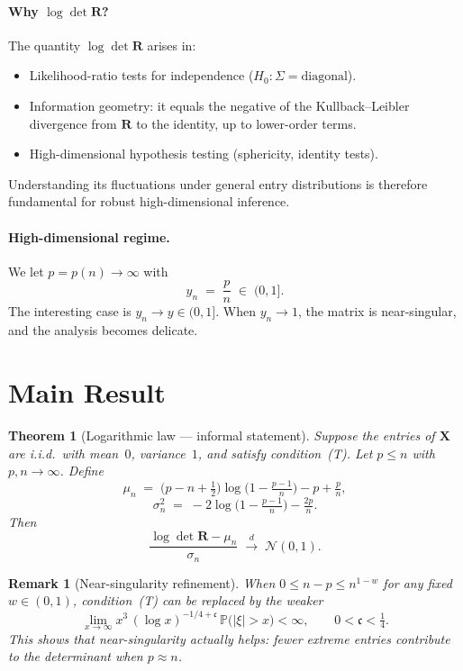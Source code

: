 \documentclass[11pt,a4paper]{article}
\newtheorem{theorem}{Theorem}
\newtheorem{remark}{Remark}
\begin{document}
\paragraph{Why $\log\det\mathbf{R}$?}
The quantity $\log\det\mathbf{R}$ arises in:
\begin{itemize}[nosep]
  \item Likelihood-ratio tests for independence ($H_0\colon \Sigma = \text{diagonal}$).
  \item Information geometry: it equals the negative of the Kullback--Leibler divergence from $\mathbf{R}$ to the identity, up to lower-order terms.
  \item High-dimensional hypothesis testing (sphericity, identity tests).
\end{itemize}
Understanding its fluctuations under general entry distributions is therefore fundamental for robust high-dimensional inference.

\paragraph{High-dimensional regime.}
We let $p = p(n) \to \infty$ with
\[
  y_n \;=\; \frac{p}{n} \;\in\; (0,1].
\]
The interesting case is $y_n \to y \in (0,1]$.  When $y_n\to 1$, the matrix is near-singular, and the analysis becomes delicate.

\section{Main Result}

\begin{theorem}[Logarithmic law --- informal statement]
Suppose the entries of $\mathbf{X}$ are i.i.d.\ with mean~$0$, variance~$1$, and satisfy condition~\emph{(T)}.
Let $p \le n$ with $p,n\to\infty$.  Define
\[
  \mu_n \;=\; \bigl(p - n + \tfrac{1}{2}\bigr)\log\!\bigl(1 - \tfrac{p-1}{n}\bigr) - p + \tfrac{p}{n},
\]
\[
  \sigma_n^{2} \;=\; -2\log\!\bigl(1 - \tfrac{p-1}{n}\bigr) - \tfrac{2p}{n}.
\]
Then
\[
  \frac{\log\det\mathbf{R} - \mu_n}{\sigma_n} \;\xrightarrow{\;d\;}\; \mathcal{N}(0,1).
\]
\end{theorem}

\begin{remark}[Near-singularity refinement]
When $0 \le n - p \le n^{1-w}$ for any fixed $w\in(0,1)$, condition~\emph{(T)} can be replaced by the weaker
\[
  \lim_{x\to\infty} x^{3}\,(\log x)^{-1/4+\mathfrak{c}}\,\mathbb{P}\!\bigl(|\xi|>x\bigr) < \infty, \qquad 0 < \mathfrak{c} < \tfrac{1}{4}.
\]
This shows that near-singularity actually \emph{helps}: fewer extreme entries contribute to the determinant when $p\approx n$.
\end{remark}
\end{document}
